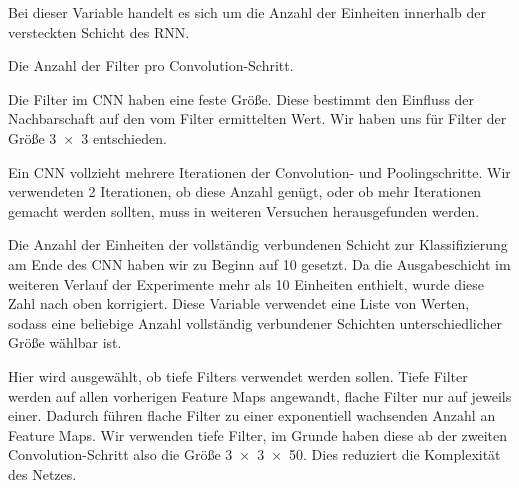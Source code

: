 \begin{description}[font=\texttt]
    \item[n\_hidden]
        Bei dieser Variable handelt es sich um die Anzahl der Einheiten innerhalb der versteckten Schicht des RNN.

    \item[convolution\_filter\_count]
        Die Anzahl der Filter pro Convolution-Schritt.

    \item[convolution\_filter\_size]
        Die Filter im CNN haben eine feste Größe. Diese bestimmt den Einfluss der Nachbarschaft auf den vom Filter ermittelten Wert. Wir haben uns für Filter der Größe \num{3 x 3} entschieden.

    \item[convolution\_iterations]
        Ein CNN vollzieht mehrere Iterationen der Convolution- und Poolingschritte. Wir verwendeten 2 Iterationen, ob diese Anzahl genügt, oder ob mehr Iterationen gemacht werden sollten, muss in weiteren Versuchen herausgefunden werden.

    \item[convolution\_dense\_layer\_units]
        Die Anzahl der Einheiten der vollständig verbundenen Schicht zur Klassifizierung am Ende des CNN haben wir zu Beginn auf 10 gesetzt. Da die Ausgabeschicht im weiteren Verlauf der Experimente mehr als 10 Einheiten enthielt, wurde diese Zahl nach oben korrigiert. Diese Variable verwendet eine Liste von Werten, sodass eine beliebige Anzahl vollständig verbundener Schichten unterschiedlicher Größe wählbar ist.

    \item[convolution\_deep\_filters]
        Hier wird ausgewählt, ob tiefe Filters verwendet werden sollen. Tiefe Filter werden auf allen vorherigen Feature Maps angewandt, flache Filter nur auf jeweils einer. Dadurch führen flache Filter zu einer exponentiell wachsenden Anzahl an Feature Maps. Wir verwenden tiefe Filter, im Grunde haben diese ab der zweiten Convolution-Schritt also die Größe \num{3 x 3 x 50}. Dies reduziert die Komplexität des Netzes.
\end{description}


